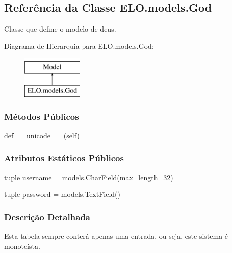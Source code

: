 \hypertarget{classELO_1_1models_1_1God}{}\subsection{Referência da Classe E\+L\+O.\+models.\+God}
\label{classELO_1_1models_1_1God}


Classe que define o modelo de deus.  


Diagrama de Hierarquia para E\+L\+O.\+models.\+God\+:\begin{figure}[H]
\begin{center}
\leavevmode
\includegraphics[height=2.000000cm]{d2/d8b/classELO_1_1models_1_1God}
\end{center}
\end{figure}
\subsubsection*{Métodos Públicos}
\begin{DoxyCompactItemize}
\item 
def \hyperlink{classELO_1_1models_1_1God_ad885cef3d586b18dd3639ebf3bfd66eb}{\+\_\+\+\_\+unicode\+\_\+\+\_\+} (self)
\end{DoxyCompactItemize}
\subsubsection*{Atributos Estáticos Públicos}
\begin{DoxyCompactItemize}
\item 
tuple \hyperlink{classELO_1_1models_1_1God_a8b9ebc1601b71f2b52e72c9fbd3030bc}{username} = models.\+Char\+Field(max\+\_\+length=32)
\item 
tuple \hyperlink{classELO_1_1models_1_1God_ae566fce421f4a31517a053af2abcff31}{password} = models.\+Text\+Field()
\end{DoxyCompactItemize}


\subsubsection{Descrição Detalhada}
Esta tabela sempre conterá apenas uma entrada, ou seja, este sistema é monoteísta. 

